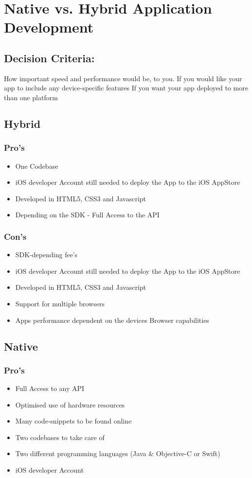 \documentclass[12pt]{article}
\begin{document}
\section{Native vs. Hybrid Application Development}

\subsection{Decision Criteria:}
How important speed and performance would be, to you.
If you would like your app to include any device-specific features
If you want your app deployed to more than one platform


\subsection{Hybrid}
\subsubsection{Pro's}
\begin{itemize}
\item One Codebase
\item iOS developer Account still needed to deploy the App to the iOS AppStore
\item Developed in HTML5, CSS3 and Javascript
\item Depending on the SDK - Full Access to the API
\end{itemize}

\subsubsection{Con's }
\begin{itemize}
\item SDK-depending fee's
\item iOS developer Account still needed to deploy the App to the iOS AppStore
\item Developed in HTML5, CSS3 and Javascript
\item Support for multiple browsers
\item Apps performance dependent on the devices Browser capabilities
\end{itemize}

\subsection{Native}

\subsubsection{Pro's}
\begin{itemize}
\item Full Access to any API
\item Optimised use of hardware resources
\item Many code-snippets to be found online
\end{itemize}

\begin{itemize}
\item Two codebases to take care of
\item Two different programming languages (Java \& Objective-C or Swift)
\item iOS developer Account
\end{itemize}
\end{document}
